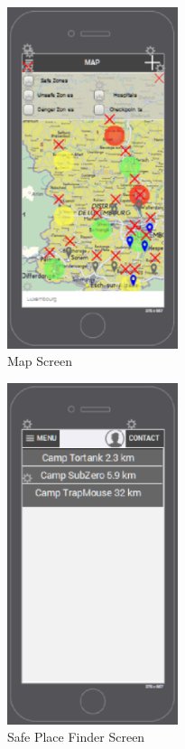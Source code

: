 \begin{figure}[htbp]
\begin{center}
 \caption{\label{fig:A7} Map Screen}
   \includegraphics[width=50mm]{./images/App/mapscreen.eps}
\end{center}
\end{figure}
\begin{figure}[htbp]
\begin{center}
 \caption{\label{fig:A8} Safe Place Finder Screen}
   \includegraphics[width=50mm]{./images/App/placefinder.eps}
\end{center}
\end{figure}
